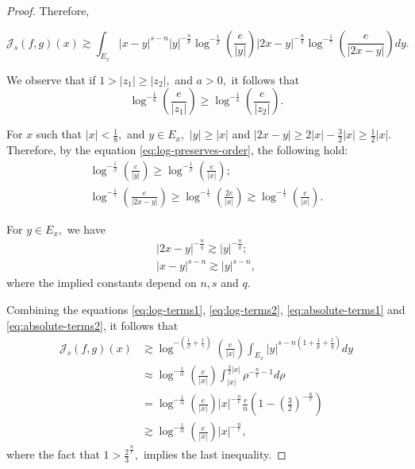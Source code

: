\documentclass[12pt]{article}
\theoremstyle{definition}
\theoremstyle{remark}
\numberwithin{equation}{section}
\begin{document}
\begin{proof}
Therefore, 

\[
\mathcal{J}_s(f,g)(x)\gtrsim \int_{E_x}|x-y|^{s-n}|y|^{-\frac{n}{p}}\log^{-\frac{1}{\beta}}\left(\frac{e}{|y|}\right)|2x-y|^{-\frac{n}{q}}\log^{-\frac{1}{\gamma}}\left(\frac{e}{|2x-y|}\right)dy.
\]

We observe that if $1>|z_1|\geq|z_2|,$ and $a>0,$ it follows that
\begin{equation} \label{eq:log-preserves-order}
    \log^{-\frac{1}{a}}\left(\frac{e}{|z_1|}\right)\geq \log^{-\frac{1}{a}}\left(\frac{e}{|z_2|}\right). 
\end{equation}

For $x$ such that $|x|<\frac{1}{8},$ and $y\in E_x,$ $|y|\geq |x|$ and $|2x-y|\geq 2|x|-\frac{3}{2}|x|\geq \frac{1}{2}|x|.$ Therefore, by the equation \eqref{eq:log-preserves-order}, the following hold:
\begin{gather} \label{eq:log-terms1}
    \log^{-\frac{1}{\beta}}\left(\frac{e}{|y|}\right)\geq \log^{-\frac{1}{\beta}}\left(\frac{e}{|x|}\right);\\ \label{eq:log-terms2}
    \log^{-\frac{1}{\gamma}}\left(\frac{e}{|2x-y|}\right)\geq \log^{-\frac{1}{\gamma}}\left(\frac{2e}{|x|}\right)\gtrsim \log^{-\frac{1}{\gamma}}\left(\frac{e}{|x|}\right).
\end{gather}

For $y\in E_x,$ we have
\begin{gather} \label{eq:absolute-terms1}
    |2x-y|^{-\frac{n}{q}}\gtrsim|y|^{-\frac{n}{q}};\\
    |x-y|^{s-n}\gtrsim |y|^{s-n}, \label{eq:absolute-terms2}
\end{gather}
where the implied constants depend on $n,s$ and $q.$

Combining the equations \eqref{eq:log-terms1}, \eqref{eq:log-terms2}, \eqref{eq:absolute-terms1} and \eqref{eq:absolute-terms2}, it follows that 
\begin{align*}
\mathcal{J}_s(f,g)(x)&\gtrsim \log^{-(\frac{1}{\beta}+\frac{1}{\gamma})}\left(\frac{e}{|x|}\right) \int_{E_x} |y|^{s-n(1+\frac{1}{p}+\frac{1}{q})}dy \\
&\approx \log^{-\frac{1}{\alpha}}\left(\frac{e}{|x|}\right) \int_{|x|}^{\frac32|x|} \rho^{-\frac{n}{r}-1} d\rho \\
&= \log^{-\frac{1}{\alpha}}\left(\frac{e}{|x|}\right)|x|^{-\frac{n}{r}} \frac{r}{n}\left(1-\left(\frac{3}{2}\right)^{-\frac{n}{r}}\right) \\
&\gtrsim \log^{-\frac{1}{\alpha}}\left(\frac{e}{|x|}\right)|x|^{-\frac{n}{r}},
\end{align*}
where the fact that $1>\frac{2}{3}^{\frac{n}{r}},$ implies the last inequality. 


\end{proof}
\end{document}
